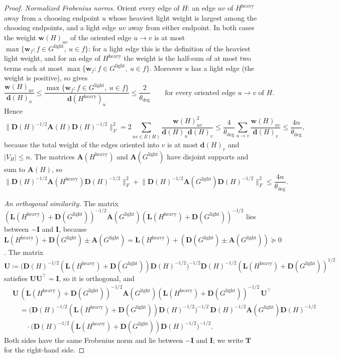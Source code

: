 \documentclass[11pt]{article}
\theoremstyle{remark}
\renewcommand{\AA}{\mathbf A}
\newcommand{\dd}{\mathbf d}
\newcommand{\DD}{\mathbf D}
\newcommand{\II}{\mathbf I}
\newcommand{\LL}{\mathbf L}
\newcommand{\ww}{\mathbf w}
\newcommand{\TT}{\mathbf T}
\newcommand{\UU}{\mathbf U}
\newcommand{\dheavy}{\theta_{\deg}}
\newcommand{\Gl}{G^{\mathrm{light}}}
\newcommand{\defeq}{\coloneqq}
\newcommand{\norm}[1]{\lVert#1\rVert}
\begin{document}
\begin{proof}
\emph{Normalized Frobenius norms.}
Orient every edge of $H$: an edge $uv$ of $H^{\mathrm{heavy}}$ away from a
choosing endpoint $u$ whose heaviest light weight is largest among the
choosing endpoints, and a light edge $uv$ away from either endpoint.
In both cases the weight $\ww(H)_{uv}$ of the oriented edge $u\to v$ is at
most $\max\{\ww_f:f\in\Gl,\ u\in f\}$: for a light edge this is the
definition of the heaviest light weight, and for an edge of
$H^{\mathrm{heavy}}$ the weight is the half-sum of at most two terms each at
most $\max\{\ww_f:f\in\Gl,\ u\in f\}$.
Moreover $u$ has a light edge (the weight is positive), so
 gives
\[
\frac{\ww(H)_{uv}}{\dd(H)_u}
\le\frac{\max\{\ww_f:f\in\Gl,\ u\in f\}}{\dd(H^{\mathrm{heavy}})_u}
\le\frac2{\dheavy}
\qquad\text{for every oriented edge $u\to v$ of $H$.}
\]
Hence
\[
\norm{\DD(H)^{-1/2}\AA(H)\DD(H)^{-1/2}}_F^{2}
=2\sum_{uv\in E(H)}\frac{\ww(H)_{uv}^{2}}{\dd(H)_u\dd(H)_v}
\le\frac4{\dheavy}\sum_{u\to v}\frac{\ww(H)_{uv}}{\dd(H)_v}
\le\frac{4n}{\dheavy},
\]
because the total weight of the edges oriented into $v$ is at most
$\dd(H)_v$ and $|V_H|\le n$.
The matrices $\AA(H^{\mathrm{heavy}})$ and $\AA(\Gl)$ have disjoint supports
and sum to $\AA(H)$, so
\begin{equation}\label{eq:twonorms}
\norm{\DD(H)^{-1/2}\AA(H^{\mathrm{heavy}})\DD(H)^{-1/2}}_F^{2}
+\norm{\DD(H)^{-1/2}\AA(\Gl)\DD(H)^{-1/2}}_F^{2}
\le\frac{4n}{\dheavy}.
\end{equation}

\emph{An orthogonal similarity.}
The matrix
$(\LL(H^{\mathrm{heavy}})+\DD(\Gl))^{-1/2}\AA(\Gl)(\LL(H^{\mathrm{heavy}})+\DD(\Gl))^{-1/2}$
lies between $-\II$ and $\II$, because
$\LL(H^{\mathrm{heavy}})+\DD(\Gl)\pm\AA(\Gl)=\LL(H^{\mathrm{heavy}})+(\DD(\Gl)\pm\AA(\Gl))\succeq0$.
The matrix
\[
\UU\defeq\bigl(\DD(H)^{-1/2}(\LL(H^{\mathrm{heavy}})+\DD(\Gl))\DD(H)^{-1/2}\bigr)^{-1/2}
\DD(H)^{-1/2}(\LL(H^{\mathrm{heavy}})+\DD(\Gl))^{1/2}
\]
satisfies $\UU\UU^{\top}=\II$, so it is orthogonal, and
\begin{equation}\label{eq:tracesim}
\begin{aligned}
&\UU\,(\LL(H^{\mathrm{heavy}})+\DD(\Gl))^{-1/2}\AA(\Gl)(\LL(H^{\mathrm{heavy}})+\DD(\Gl))^{-1/2}\,\UU^{\top}\\
&\quad=\bigl(\DD(H)^{-1/2}(\LL(H^{\mathrm{heavy}})+\DD(\Gl))\DD(H)^{-1/2}\bigr)^{-1/2}
\,\DD(H)^{-1/2}\AA(\Gl)\DD(H)^{-1/2}\,\\
&\qquad\cdot\bigl(\DD(H)^{-1/2}(\LL(H^{\mathrm{heavy}})+\DD(\Gl))\DD(H)^{-1/2}\bigr)^{-1/2}.
\end{aligned}
\end{equation}
Both sides have the same Frobenius norm and lie between $-\II$ and $\II$;
we write $\TT$ for the right-hand side.


\end{proof}
\end{document}
